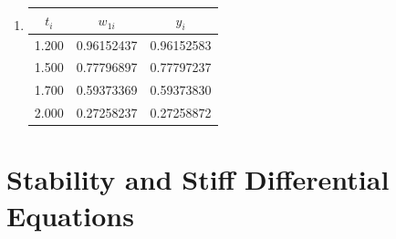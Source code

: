 \begin{myexercise}
\begin{mysolution}
\begin{enumerate}[label=(\alph*).]
\item
\begin{center}
\begin{tabular}{ccc}
\hline
$t_{i}$ & $w_{1 i}$ & $y_{i}$ \\
\hline
1.200 & 0.96152437 & 0.96152583 \\
1.500 & 0.77796897 & 0.77797237 \\
1.700 & 0.59373369 & 0.59373830 \\
2.000 & 0.27258237 & 0.27258872 \\
\end{tabular}
\end{center}


%
%
%

\end{enumerate}
\end{mysolution}
\end{myexercise}





\section{Stability and Stiff Differential Equations}

